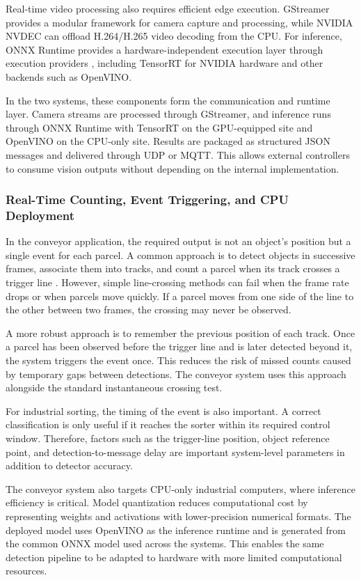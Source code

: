 \documentclass[9pt,a4paper,twocolumn]{rho-class/rho}
\begin{document}
Real-time video processing also requires efficient edge execution. GStreamer provides a modular framework for camera capture and processing, while NVIDIA NVDEC can offload H.264/H.265 video decoding from the CPU. For inference, ONNX Runtime provides a hardware-independent execution layer through execution providers \cite{onnxruntime}, including TensorRT for NVIDIA hardware and other backends such as OpenVINO.

In the two systems, these components form the communication and runtime layer. Camera streams are processed through GStreamer, and inference runs through ONNX Runtime with TensorRT on the GPU-equipped site and OpenVINO on the CPU-only site. Results are packaged as structured JSON messages and delivered through UDP or MQTT. This allows external controllers to consume vision outputs without depending on the internal implementation.

\subsubsection{Real-Time Counting, Event Triggering, and CPU Deployment}

In the conveyor application, the required output is not an object's position but a single event for each parcel. A common approach is to detect objects in successive frames, associate them into tracks, and count a parcel when its track crosses a trigger line \cite{bochinski2017iou}. However, simple line-crossing methods can fail when the frame rate drops or when parcels move quickly. If a parcel moves from one side of the line to the other between two frames, the crossing may never be observed.

A more robust approach is to remember the previous position of each track. Once a parcel has been observed before the trigger line and is later detected beyond it, the system triggers the event once. This reduces the risk of missed counts caused by temporary gaps between detections. The conveyor system uses this approach alongside the standard instantaneous crossing test.

For industrial sorting, the timing of the event is also important. A correct classification is only useful if it reaches the sorter within its required control window. Therefore, factors such as the trigger-line position, object reference point, and detection-to-message delay are important system-level parameters in addition to detector accuracy.

The conveyor system also targets CPU-only industrial computers, where inference efficiency is critical. Model quantization reduces computational cost by representing weights and activations with lower-precision numerical formats. The deployed model uses OpenVINO as the inference runtime and is generated from the common ONNX model used across the systems. This enables the same detection pipeline to be adapted to hardware with more limited computational resources.
\end{document}
